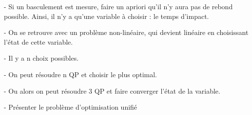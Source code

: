 				- Si un basculement est mesure, faire un apriori qu'il n'y aura pas de rebond possible. Ainsi, il n'y a qu'une variable à choisir : le temps d'impact.

				- On se retrouve avec un problème non-linéaire, qui devient linéaire en choisissant l'état de cette variable.

				- Il y a n choix possibles.

				- On peut résoudre n QP et choisir le plus optimal.

				- Ou alors on peut résoudre 3 QP et faire converger l'état de la variable.

				- Présenter le problème d'optimisation unifié